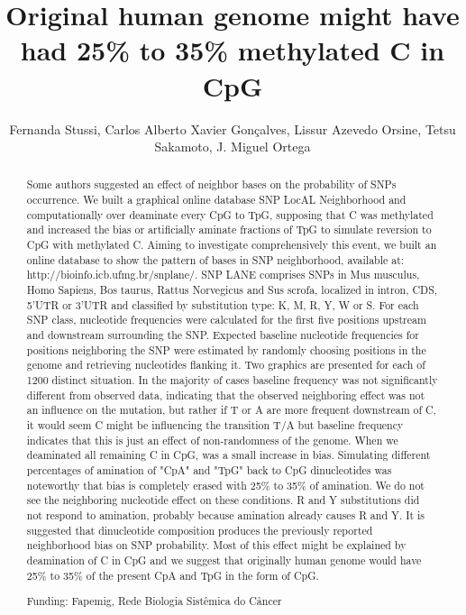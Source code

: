\documentclass[twoside]{article}
\title{\vspace{-15mm}\fontsize{24pt}{10pt}\selectfont\textbf{ Original human genome might have had 25\% to 35\% methylated C in CpG }} %
\author{ Fernanda Stussi, Carlos Alberto Xavier Gon\c{c}alves, Lissur Azevedo Orsine, Tetsu Sakamoto, J. Miguel Ortega }
\affil{ UFMG }
\date{}
\begin{document}
  
  
  \maketitle %
  
  
  \thispagestyle{fancy} %
  
  
  \begin{abstract}
  Some authors suggested an effect of neighbor bases on the probability of SNPs occurrence. We built a graphical online database SNP LocAL Neighborhood and computationally over deaminate every CpG to TpG,  supposing that C was methylated and increased the bias or artificially aminate fractions of TpG to simulate reversion to CpG with methylated C. Aiming to investigate comprehensively this event,  we built an online database to show the pattern of bases in SNP neighborhood,  available at: http://bioinfo.icb.ufmg.br/snplane/. SNP LANE comprises SNPs in Mus musculus,  Homo Sapiens,  Bos taurus,  Rattus Norvegicus and Sus scrofa,  localized in intron,  CDS,  5’UTR or 3’UTR and classified by substitution type: K,  M,  R,  Y,  W or S. For each SNP class,  nucleotide frequencies were calculated for the first five positions upstream and downstream surrounding the SNP. Expected baseline nucleotide frequencies for positions neighboring the SNP were estimated by randomly choosing positions in the genome and retrieving nucleotides flanking it. Two graphics are presented for each of 1200 distinct situation. In the majority of cases baseline frequency was not significantly different from observed data,  indicating that the observed neighboring effect was not an influence on the mutation,  but rather if T or A are more frequent downstream of C,  it would seem C might be influencing the transition T/A but baseline frequency indicates that this is just an effect of non-randomness of the genome. When we deaminated all remaining C in CpG,  was a small increase in bias. Simulating different percentages of amination of "CpA" and "TpG" back to CpG dinucleotides was noteworthy that bias is completely erased with 25\% to 35\% of amination. We do not see the neighboring nucleotide effect on these conditions. R and Y substitutions did not respond to amination,  probably because amination already causes R and Y.  It is suggested that dinucleotide composition produces the previously reported neighborhood bias on SNP probability. Most of this effect might be explained by deamination of C in CpG and we suggest that originally human genome would have 25\% to 35\% of the present CpA and TpG in the form of CpG.
  
  Funding: Fapemig,  Rede Biologia Sist\^emica do C\^ancer \\ 
  \end{abstract}
  
\end{document}
